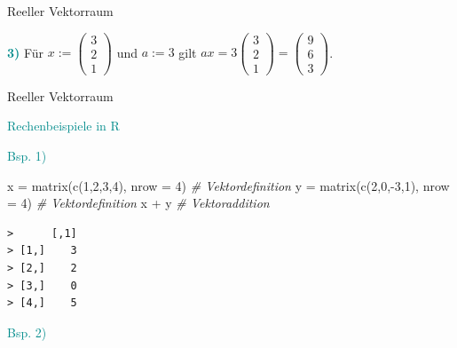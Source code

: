 \documentclass[
  8pt,
  ignorenonframetext,
]{beamer}
\newenvironment{Shaded}{\begin{snugshade}}{\end{snugshade}}
\newcommand{\AttributeTok}[1]{\textcolor[rgb]{0.77,0.63,0.00}{#1}}
\newcommand{\CommentTok}[1]{\textcolor[rgb]{0.56,0.35,0.01}{\textit{#1}}}
\newcommand{\DecValTok}[1]{\textcolor[rgb]{0.00,0.00,0.81}{#1}}
\newcommand{\FunctionTok}[1]{\textcolor[rgb]{0.00,0.00,0.00}{#1}}
\newcommand{\NormalTok}[1]{#1}
\newcommand{\OtherTok}[1]{\textcolor[rgb]{0.56,0.35,0.01}{#1}}
\newcommand{\SpecialCharTok}[1]{\textcolor[rgb]{0.00,0.00,0.00}{#1}}
\begin{document}
\begin{frame}{Reeller Vektorraum}
\vspace{6pt}

\textbf{\textcolor{darkcyan}{3)}} Für
\(x:= \begin{pmatrix}3\\2\\1\end{pmatrix}\) und \(a:=3\) gilt
\(ax = 3\begin{pmatrix}3\\2\\1\end{pmatrix} = \begin{pmatrix}9\\6\\3\end{pmatrix}\).
\end{frame}

\begin{frame}[fragile]{Reeller Vektorraum}
\protect\hypertarget{reeller-vektorraum-4}{}
\vspace{3mm}

\textcolor{darkcyan}{Rechenbeispiele in R}

\footnotesize

\textcolor{darkcyan}{Bsp. 1)} \tiny

\begin{Shaded}
\begin{Highlighting}[]
\NormalTok{x }\OtherTok{=} \FunctionTok{matrix}\NormalTok{(}\FunctionTok{c}\NormalTok{(}\DecValTok{1}\NormalTok{,}\DecValTok{2}\NormalTok{,}\DecValTok{3}\NormalTok{,}\DecValTok{4}\NormalTok{), }\AttributeTok{nrow =} \DecValTok{4}\NormalTok{)   }\CommentTok{\# Vektordefinition}
\NormalTok{y }\OtherTok{=} \FunctionTok{matrix}\NormalTok{(}\FunctionTok{c}\NormalTok{(}\DecValTok{2}\NormalTok{,}\DecValTok{0}\NormalTok{,}\SpecialCharTok{{-}}\DecValTok{3}\NormalTok{,}\DecValTok{1}\NormalTok{), }\AttributeTok{nrow =} \DecValTok{4}\NormalTok{)  }\CommentTok{\# Vektordefinition}
\NormalTok{x }\SpecialCharTok{+}\NormalTok{ y                              }\CommentTok{\# Vektoraddition}
\end{Highlighting}
\end{Shaded}

\begin{verbatim}
>      [,1]
> [1,]    3
> [2,]    2
> [3,]    0
> [4,]    5
\end{verbatim}

\footnotesize

\textcolor{darkcyan}{Bsp. 2)} \tiny


\end{frame}
\end{document}
